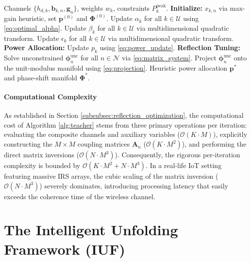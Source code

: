 \documentclass[journal]{IEEEtran}
\begin{document}
\begin{algorithm}[H]
\caption{Classical AO-Based Local Search (The Pseudo-Label Generator)}
\label{alg:teacher}
\begin{algorithmic}[1]
\renewcommand{\algorithmicrequire}{\textbf{Input:}}
\renewcommand{\algorithmicensure}{\textbf{Output:}}
\REQUIRE Channels $\{h_{d,k}, \mathbf{b}_{k,n}, \mathbf{g}_n\}$, weights $w_k$, constraints $P_k^{\text{peak}}$.
\STATE \textbf{Initialize:} $x_{k,n}$ via max-gain heuristic, set $\mathbf{p}^{(0)}$ and $\boldsymbol{\Phi}^{(0)}$.
\REPEAT
    \STATE Update $\alpha_k$ for all $k \in \mathcal{U}$ using \eqref{eq:optimal_alpha}.
    \STATE Update $\beta_k$ for all $k \in \mathcal{U}$ via multidimensional quadratic transform.
    \STATE Update $\epsilon_k$ for all $k \in \mathcal{U}$ via multidimensional quadratic transform.
    \STATE \textbf{Power Allocation:} Update $p_k$ using \eqref{eq:power_update}.
    \STATE \textbf{Reflection Tuning:} Solve unconstrained $\boldsymbol{\phi}_n^{\text{unc}}$ for all $n \in \mathcal{N}$ via \eqref{eq:matrix_system}.
    \STATE Project $\boldsymbol{\phi}_n^{\text{unc}}$ onto the unit-modulus manifold using \eqref{eq:projection}.
\ENSURE Heuristic power allocation $\mathbf{p}^*$ and phase-shift manifold $\boldsymbol{\Phi}^*$.
\end{algorithmic}
\end{algorithm}

\paragraph{Computational Complexity}
As established in Section \ref{subsubsec:reflection_optimization}, the computational cost of Algorithm \ref{alg:teacher} stems from three primary operations per iteration: evaluating the composite channels and auxiliary variables ($\mathcal{O}(K \cdot M)$), explicitly constructing the $M \times M$ coupling matrices $\mathbf{A}_n$ ($\mathcal{O}(K \cdot M^2)$), and performing the direct matrix inversions ($\mathcal{O}(N \cdot M^3)$). Consequently, the rigorous per-iteration complexity is bounded by $\mathcal{O}(K \cdot M^2 + N \cdot M^3)$. In a real-life IoT setting featuring massive IRS arrays, the cubic scaling of the matrix inversion ($\mathcal{O}(N \cdot M^3)$) severely dominates, introducing processing latency that easily exceeds the coherence time of the wireless channel.

\section{The Intelligent Unfolding Framework (IUF)}
\label{sec:unfolding_framework}
\end{document}
